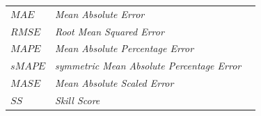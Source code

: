 \begin{longtable}{@{} l >{\raggedright\arraybackslash}p{6.5cm} c @{}}

$MAE$ & \textit{Mean Absolute Error} & \pageref{sym:MAE} \\
$RMSE$ & \textit{Root Mean Squared Error} & \pageref{sym:RMSE} \\
$MAPE$ & \textit{Mean Absolute Percentage Error} & \pageref{sym:MAPE} \\
$sMAPE$ & \textit{symmetric Mean Absolute Percentage Error} & \pageref{sym:sMAPE} \\
$MASE$ & \textit{Mean Absolute Scaled Error} & \pageref{sym:MASE} \\
$SS$ & \textit{Skill Score} & \pageref{sym:SS} \\[1ex]

\end{longtable}
